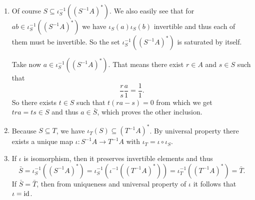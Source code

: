 \begin{exercise}{4}
    \begin{enumerate}
        \item Of course $S \subseteq \iota^{-1}_S({(S^{-1}A)}^*)$. We also
            easily see that for $ab \in \iota^{-1}_S({(S^{-1}A)}^*)$ we have
            $\iota_S(a) \iota_S(b)$ invertible and thus each of them must be
            invertible. So the set $\iota^{-1}_S({(S^{-1}A)}^*)$ is saturated by
            itself.

            Take now $a \in \iota^{-1}_S({(S^{-1}A)}^*)$. That means there exist
            $r \in A$ and $s \in S$ such that
            \begin{equation*}
                \frac{r}{s} \frac{a}{1} = \frac{1}{1}.
            \end{equation*}
            So there exists $t \in S$ such that $t(ra - s) = 0$ from which we
            get $tra = ts \in S$ and thus $a \in \bar{S}$, which proves the
            other inclusion.
        \item Because $S \subseteq T$, we have $\iota_T(S) \subseteq
            {(T^{-1}A)}^*$. By universal property there exists a unique map
            $\iota \colon S^{-1}A \rightarrow T^{-1}A$ with $\iota_T = \iota
            \circ \iota_S$.
        \item If $\iota$ is isomorphism, then it preserves invertible elements
            and thus
            \begin{equation*}
                \bar{S} = \iota^{-1}_S({(S^{-1}A)}^*) =
                \iota^{-1}_S(\iota^{-1}({(T^{-1}A)}^*)) =
                \iota^{-1}_T({(T^{-1}A)}^*) = \bar{T}.
            \end{equation*}
            If $\bar{S} = \bar{T}$, then from uniqueness and universal property
            of $\iota$ it follows that $\iota = \operatorname{id}$.
    \end{enumerate}
\end{exercise}


